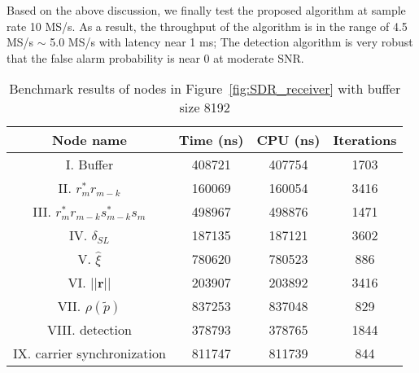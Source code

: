 Based on the above discussion, we finally test the proposed algorithm at sample rate
10 MS/s. As a result, the throughput of the algorithm is in the range of 4.5 MS/s $\sim$ 5.0 MS/s with latency near 1 ms;
The detection algorithm is very robust that the false alarm probability is near 0 at moderate SNR.

\begin{table}[t]
    \caption{Benchmark results of nodes in Figure~\ref{fig:SDR_receiver} with buffer size 8192}  %
    \centering %
    \begin{tabular}{c c c c} %
    \hline\hline %
    Node name & Time (ns) & CPU (ns) & Iterations \\ [0.5ex] %
    \hline %
    I. Buffer  & 408721 & 407754 & 1703 \\ %
    II. $r_m^*r_{m-k}$  & 160069 & 160054 & 3416 \\
    III. $r_m^*r_{m-k}s_{m-k}^*s_m$ & 498967 & 498876 & 1471 \\
    IV. $\hat{\delta}_{SL}$ & 187135 & 187121 & 3602 \\
    V. $\hat{\xi}$ & 780620 & 780523 & 886 \\
    VI. $||\bm{r}||$ & 203907 & 203892 & 3416 \\ %
    VII. $\rho(\tilde{p})$ & 837253 & 837048 & 829 \\
    VIII. detection & 378793 & 378765 & 1844 \\
    IX. carrier synchronization & 811747 & 811739 & 844  \\ [1ex]
    \hline
    \end{tabular}
    \label{table:BM_function_nodes} %
  \end{table}

